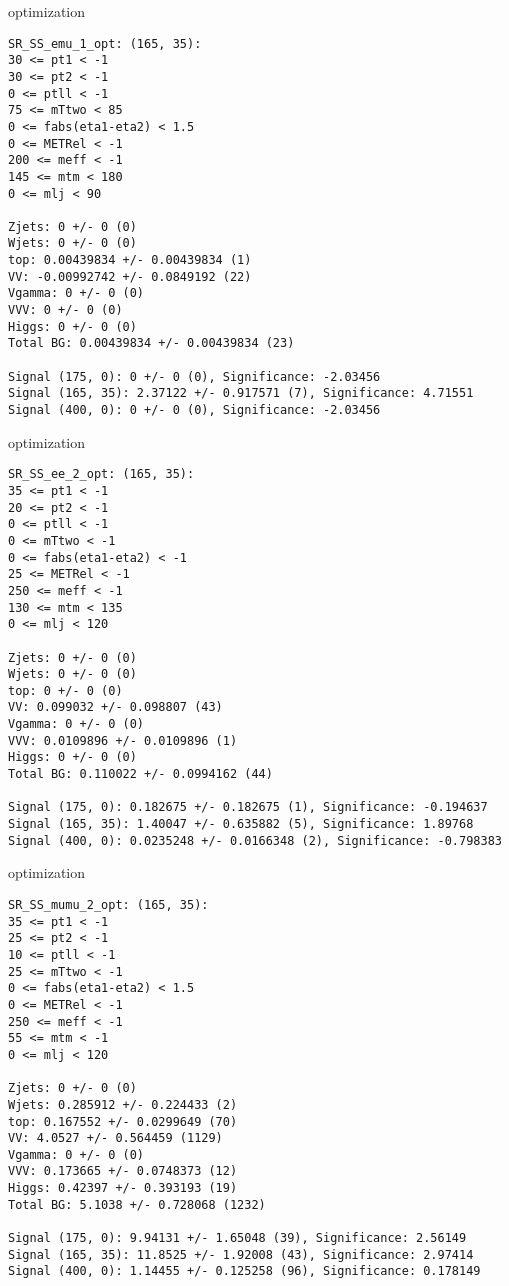 \begin{frame}[fragile]{optimization}
\tiny
\begin{verbatim}
SR_SS_emu_1_opt: (165, 35):
30 <= pt1 < -1
30 <= pt2 < -1
0 <= ptll < -1
75 <= mTtwo < 85
0 <= fabs(eta1-eta2) < 1.5
0 <= METRel < -1
200 <= meff < -1
145 <= mtm < 180
0 <= mlj < 90

Zjets: 0 +/- 0 (0)
Wjets: 0 +/- 0 (0)
top: 0.00439834 +/- 0.00439834 (1)
VV: -0.00992742 +/- 0.0849192 (22)
Vgamma: 0 +/- 0 (0)
VVV: 0 +/- 0 (0)
Higgs: 0 +/- 0 (0)
Total BG: 0.00439834 +/- 0.00439834 (23)

Signal (175, 0): 0 +/- 0 (0), Significance: -2.03456
Signal (165, 35): 2.37122 +/- 0.917571 (7), Significance: 4.71551
Signal (400, 0): 0 +/- 0 (0), Significance: -2.03456
\end{verbatim}
\end{frame}

\begin{frame}[fragile]{optimization}
\tiny
\begin{verbatim}
SR_SS_ee_2_opt: (165, 35):
35 <= pt1 < -1
20 <= pt2 < -1
0 <= ptll < -1
0 <= mTtwo < -1
0 <= fabs(eta1-eta2) < -1
25 <= METRel < -1
250 <= meff < -1
130 <= mtm < 135
0 <= mlj < 120

Zjets: 0 +/- 0 (0)
Wjets: 0 +/- 0 (0)
top: 0 +/- 0 (0)
VV: 0.099032 +/- 0.098807 (43)
Vgamma: 0 +/- 0 (0)
VVV: 0.0109896 +/- 0.0109896 (1)
Higgs: 0 +/- 0 (0)
Total BG: 0.110022 +/- 0.0994162 (44)

Signal (175, 0): 0.182675 +/- 0.182675 (1), Significance: -0.194637
Signal (165, 35): 1.40047 +/- 0.635882 (5), Significance: 1.89768
Signal (400, 0): 0.0235248 +/- 0.0166348 (2), Significance: -0.798383
\end{verbatim}
\end{frame}

\begin{frame}[fragile]{optimization}
\tiny
\begin{verbatim}
SR_SS_mumu_2_opt: (165, 35):
35 <= pt1 < -1
25 <= pt2 < -1
10 <= ptll < -1
25 <= mTtwo < -1
0 <= fabs(eta1-eta2) < 1.5
0 <= METRel < -1
250 <= meff < -1
55 <= mtm < -1
0 <= mlj < 120

Zjets: 0 +/- 0 (0)
Wjets: 0.285912 +/- 0.224433 (2)
top: 0.167552 +/- 0.0299649 (70)
VV: 4.0527 +/- 0.564459 (1129)
Vgamma: 0 +/- 0 (0)
VVV: 0.173665 +/- 0.0748373 (12)
Higgs: 0.42397 +/- 0.393193 (19)
Total BG: 5.1038 +/- 0.728068 (1232)

Signal (175, 0): 9.94131 +/- 1.65048 (39), Significance: 2.56149
Signal (165, 35): 11.8525 +/- 1.92008 (43), Significance: 2.97414
Signal (400, 0): 1.14455 +/- 0.125258 (96), Significance: 0.178149
\end{verbatim}
\end{frame}

